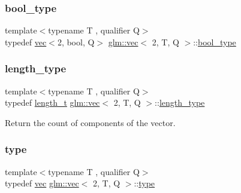 \subsubsection{\texorpdfstring{bool\+\_\+type}{bool\_type}}
{\footnotesize\ttfamily template$<$typename T , qualifier Q$>$ \\
typedef \mbox{\hyperlink{structglm_1_1vec}{vec}}$<$2, bool, Q$>$ \mbox{\hyperlink{structglm_1_1vec}{glm\+::vec}}$<$ 2, T, Q $>$\+::\mbox{\hyperlink{structglm_1_1vec_3_012_00_01_t_00_01_q_01_4_a69145b83aafbff09d5d187089564c46f}{bool\+\_\+type}}}

\mbox{\label{structglm_1_1vec_3_012_00_01_t_00_01_q_01_4_af8b652526ec88c8513b2a8c05bf92441}} 
\subsubsection{\texorpdfstring{length\+\_\+type}{length\_type}}
{\footnotesize\ttfamily template$<$typename T , qualifier Q$>$ \\
typedef \mbox{\hyperlink{namespaceglm_a090a0de2260835bee80e71a702492ed9}{length\+\_\+t}} \mbox{\hyperlink{structglm_1_1vec}{glm\+::vec}}$<$ 2, T, Q $>$\+::\mbox{\hyperlink{structglm_1_1vec_3_012_00_01_t_00_01_q_01_4_af8b652526ec88c8513b2a8c05bf92441}{length\+\_\+type}}}



Return the count of components of the vector. 

\mbox{\label{structglm_1_1vec_3_012_00_01_t_00_01_q_01_4_a2734b4716ffba77d4ce4cc866cb31d3f}} 
\subsubsection{\texorpdfstring{type}{type}}
{\footnotesize\ttfamily template$<$typename T , qualifier Q$>$ \\
typedef \mbox{\hyperlink{structglm_1_1vec}{vec}} \mbox{\hyperlink{structglm_1_1vec}{glm\+::vec}}$<$ 2, T, Q $>$\+::\mbox{\hyperlink{structglm_1_1vec_3_012_00_01_t_00_01_q_01_4_a2734b4716ffba77d4ce4cc866cb31d3f}{type}}}

